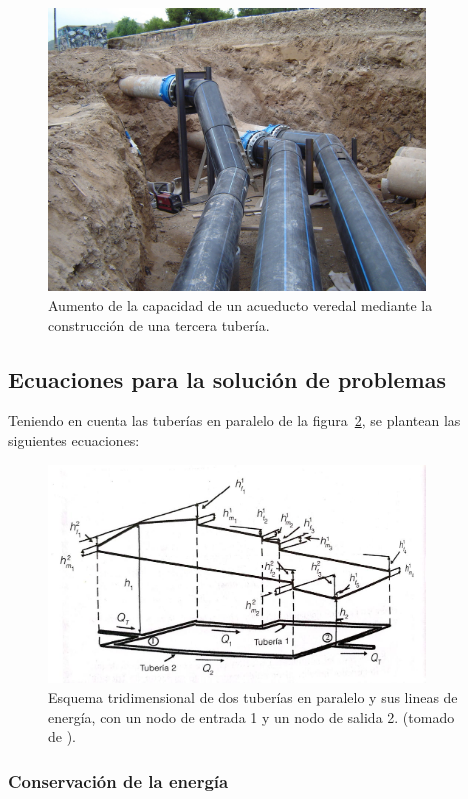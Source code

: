 \documentclass[11pt, oneside]{article}
\begin{document}
\begin{figure}[h]
\centering
\includegraphics[width=10cm]{./figs/comp31.jpeg}
\caption{Aumento de la capacidad de un acueducto veredal mediante la construcci\'on de una tercera tuber\'ia.}
\label{comp3}
\end{figure}


\subsection{Ecuaciones para la soluci\'on de problemas}
Teniendo en cuenta las tuber\'ias en paralelo de la figura~\ref{comp3}, se plantean las siguientes ecuaciones:
\begin{figure}[h]
\centering
\includegraphics[width=10cm]{./figs/comp3.jpeg}
\caption{Esquema tridimensional de dos tuber\'ias en paralelo y sus lineas de energ\'ia, con un nodo de entrada 1 y un nodo de salida 2. (tomado de \cite{saldarriaga}).} 
\label{comp3}
\end{figure}

\subsubsection*{Conservaci\'on de la energ\'ia}
\end{document}
